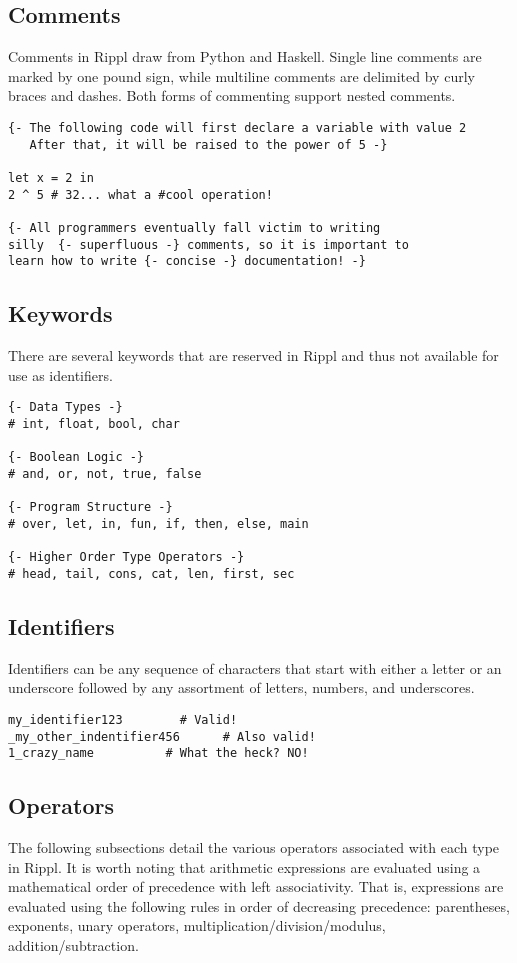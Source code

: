 \documentclass[5pt]{article}
\begin{document}
\newpage 
\subsection{Comments}
Comments in Rippl draw from Python and Haskell. Single line comments are marked by one pound sign, while multiline comments are delimited by curly braces and dashes. Both forms of commenting support nested comments.
\begin{lstlisting}[language=rippl]
{- The following code will first declare a variable with value 2
   After that, it will be raised to the power of 5 -}
   
let x = 2 in
2 ^ 5 # 32... what a #cool operation!

{- All programmers eventually fall victim to writing 
silly  {- superfluous -} comments, so it is important to 
learn how to write {- concise -} documentation! -}
\end{lstlisting}
\subsection{Keywords}
There are several keywords that are reserved in Rippl and thus not available for use as identifiers.
\begin{lstlisting}[language=rippl]
{- Data Types -}
# int, float, bool, char

{- Boolean Logic -}
# and, or, not, true, false

{- Program Structure -}
# over, let, in, fun, if, then, else, main

{- Higher Order Type Operators -}
# head, tail, cons, cat, len, first, sec
\end{lstlisting}
\subsection{Identifiers}
Identifiers can be any sequence of characters that start with either a letter or an underscore followed by any assortment of letters, numbers, and underscores.
\begin{lstlisting}[language=rippl]
my_identifier123        # Valid!
_my_other_indentifier456      # Also valid!
1_crazy_name          # What the heck? NO!
\end{lstlisting}
\newpage
\subsection{Operators}
The following subsections detail the various operators associated with each type in Rippl. It is worth noting that arithmetic expressions are evaluated using a mathematical
order of precedence with left associativity. That is, expressions are evaluated using the following rules in order of decreasing precedence: parentheses, exponents, unary operators, multiplication/division/modulus, addition/subtraction. 
\end{document}
